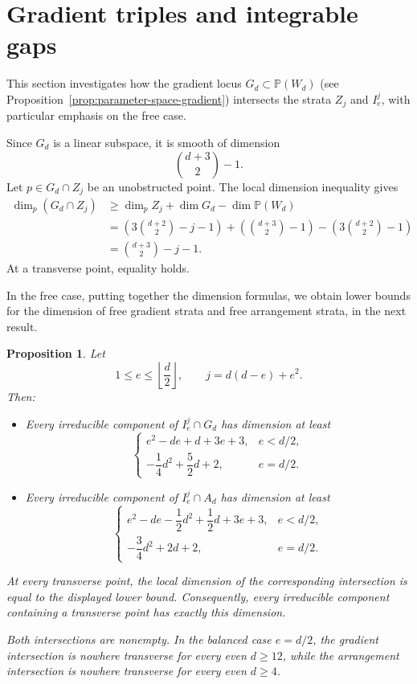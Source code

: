 \documentclass[11pt]{amsart} %
\newtheorem{Proposition}[Theorem]{Proposition}
\theoremstyle{definition}
\def\NZQ{\mathbb}               %
\def\PP{{\NZQ P}}
\begin{document}
\section{Gradient triples and integrable gaps}\label{sec:gradient-gaps}

This section investigates how the gradient locus
\(
G_d\subset\PP(W_d)
\)
(see Proposition~\ref{prop:parameter-space-gradient}) intersects the strata $Z_j$ and $I_e^j$, with particular emphasis on
the free case.

Since $G_d$ is a linear subspace, it is smooth of dimension
\[
\binom{d+3}{2}-1.
\]
Let \(p\in G_d\cap Z_j\) be an unobstructed point. The local dimension inequality gives
\begin{align*}
\dim_p(G_d\cap Z_j)
&\geq
\dim_p Z_j+\dim G_d-\dim\PP(W_d)\\
&=
\left(
3\binom{d+2}{2}-j-1
\right)
+
\left(
\binom{d+3}{2}-1
\right)
-
\left(
3\binom{d+2}{2}-1
\right)\\
&=
\binom{d+3}{2}-j-1.
\end{align*}
At a transverse point, equality holds.

In the free case, putting together the dimension formulas, we obtain lower bounds for the dimension of free gradient strata and free arrangement strata, in the next result.

\begin{Proposition}\label{prop:dimension-bound-free-families}
Let
\[
1\leq e\leq\left\lfloor\frac d2\right\rfloor,
\qquad
j=d(d-e)+e^2.
\]
Then:

\begin{itemize}
\item[(a)] Every irreducible component of \(I_e^j\cap G_d\) has dimension at least
\[
\begin{cases}
e^2-de+d+3e+3, & e<d/2,\\[1mm]
-\dfrac14d^2+\dfrac52d+2, & e=d/2.
\end{cases}
\]

\item[(b)] Every irreducible component of \(
I_e^j\cap A_d\) has dimension at least
\[
\begin{cases}
e^2-de-\dfrac12d^2+\dfrac12d+3e+3,
& e<d/2,\\[1mm]
-\dfrac34d^2+2d+2,
& e=d/2.
\end{cases}
\]
\end{itemize}

At every transverse point, the local dimension of the corresponding intersection is equal to the displayed lower bound. Consequently, every irreducible component containing a transverse point has exactly this dimension.

Both intersections are nonempty. In the balanced case $e=d/2$, the
gradient intersection is nowhere transverse for every even
$d\geq12$, while the arrangement intersection is nowhere transverse
for every even $d\geq4$.
\end{Proposition}
\end{document}

